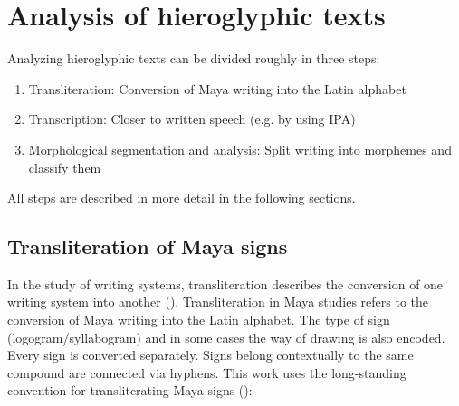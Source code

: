 \documentclass[../main.tex]{subfiles}
\begin{document}
\section{Analysis of hieroglyphic texts}
Analyzing hieroglyphic texts can be divided roughly in three steps:
\begin{enumerate}
    \item Transliteration: Conversion of Maya writing into the Latin alphabet
    \item Transcription: Closer to written speech (e.g. by using IPA)
    \item Morphological segmentation and analysis: Split writing into morphemes and classify them
\end{enumerate}
All steps are described in more detail in the following sections.

\subsection{Transliteration of Maya signs}
In the study of writing systems, transliteration describes the conversion of one 
writing system into another (\cite[494]{crystal2008}).
Transliteration in Maya studies refers to the conversion of Maya writing into the Latin alphabet.
The type of sign (logogram/syllabogram) and in some cases the way of drawing is also encoded.
Every sign is converted separately.
Signs belong contextually to the same compound are connected via hyphens. 
This work uses the long-standing convention for transliterating 
Maya signs (\cite{jamesjusteson1984}):
\end{document}
